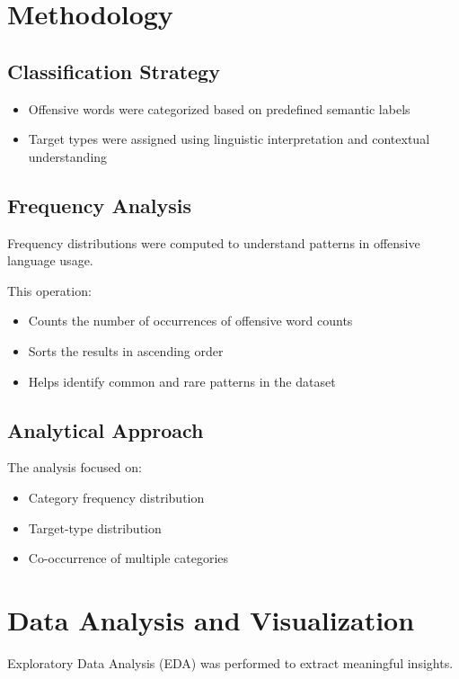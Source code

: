 \documentclass[12pt]{article}
\begin{document}
\section{Methodology}

\subsection{Classification Strategy}

\begin{itemize}
    \item Offensive words were categorized based on predefined semantic labels
    \item Target types were assigned using linguistic interpretation and contextual understanding
\end{itemize}

\subsection{Frequency Analysis}

Frequency distributions were computed to understand patterns in offensive language usage.

This operation:
\begin{itemize}
    \item Counts the number of occurrences of offensive word counts
    \item Sorts the results in ascending order
    \item Helps identify common and rare patterns in the dataset
\end{itemize}

\subsection{Analytical Approach}

The analysis focused on:
\begin{itemize}
    \item Category frequency distribution
    \item Target-type distribution
    \item Co-occurrence of multiple categories
\end{itemize}

\section{Data Analysis and Visualization}

Exploratory Data Analysis (EDA) was performed to extract meaningful insights.
\end{document}
